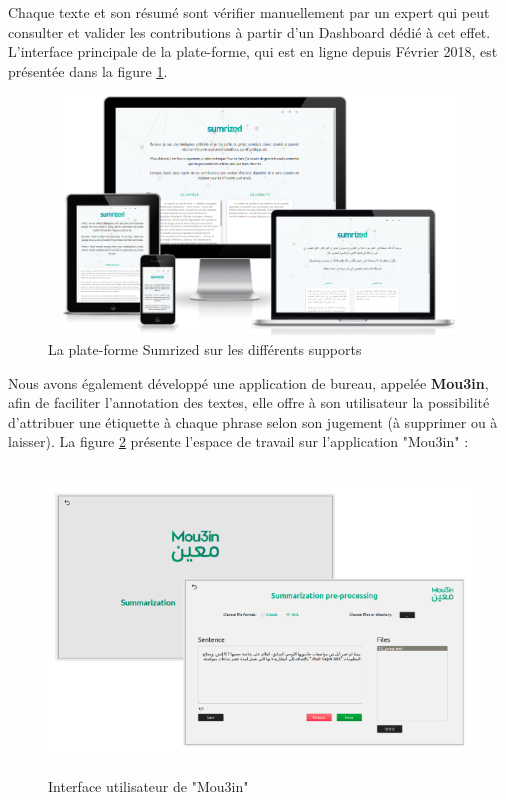 \begin{itemize}[leftmargin=*]
                Chaque texte et son résumé sont vérifier manuellement par un expert qui peut consulter et valider les contributions à partir d'un Dashboard dédié à cet effet. L'interface principale de la plate-forme, qui est en ligne depuis Février 2018, est présentée dans la figure \ref{sumrized-ui}. 

                \begin{figure}[H]
                    \centering
                    \includegraphics[height=180pt,width=320pt]{img/chapter4/sumrized/responsive.png}
                    \caption{La plate-forme Sumrized sur les différents supports}
                    \label{sumrized-ui}
                \end{figure} 

                Nous avons également développé une application de bureau, appelée \textbf{Mou3in}, afin de faciliter l'annotation des textes, elle offre à son utilisateur la possibilité d'attribuer une étiquette à chaque phrase selon son jugement (à supprimer ou à laisser). La figure \ref{mou3in} présente l'espace de travail sur l'application "Mou3in" :
                \begin{figure}[H]
                    \centering
                    \includegraphics[height=230pt,width=370pt]{img/chapter4/mou3in/mou3in.png}
                    \caption{Interface utilisateur de "Mou3in"}
                    \label{mou3in}
                \end{figure}


\end{itemize}
